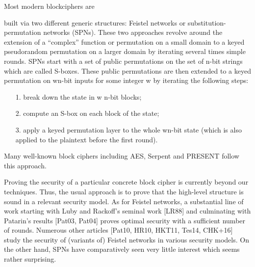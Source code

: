 



Most modern blockciphers are

built via two different generic structures: Feistel networks or substitution-permutation
networks (SPNs). These two approaches revolve around the extension of a ``complex'' function or permutation on a small domain to a keyed pseudorandom
permutation on a larger domain by iterating several times simple rounds.
SPNs start with a set of public permutations on the set of n-bit strings which
are called S-boxes. These public permutations are then extended to a keyed
permutation on wn-bit inputs for some integer w by iterating the following steps:
\begin{enumerate}
	\item[1.] break down the state in w n-bit blocks;
	\item[2.] compute an S-box on each block of the state;
	\item[3.] apply a keyed permutation layer to the whole wn-bit state (which is also applied to the plaintext before the first round).
\end{enumerate}


Many well-known block ciphers including AES, Serpent and PRESENT follow
this approach.


Proving the security of a particular concrete block cipher is
currently beyond our techniques. Thus, the usual approach is to prove that the
high-level structure is sound in a relevant security model. As for Feistel networks,
a substantial line of work starting with Luby and Rackoff's seminal work [LR88]
and culminating with Patarin's results [Pat03, Pat04] proves optimal security with
a sufficient number of rounds. Numerous other articles [Pat10, HR10, HKT11,
Tes14, CHK+16] study the security of (variants of) Feistel networks in various
security models. On the other hand, SPNs have comparatively seen very little
interest which seems rather surprising.





